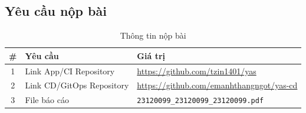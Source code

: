 \subsection{Yêu cầu nộp bài}

\begin{table}[H]
\centering
\caption{Thông tin nộp bài}
\begin{tabular}{|c|p{6cm}|p{7cm}|}
\hline
\textbf{\#} & \textbf{Yêu cầu} & \textbf{Giá trị} \\
\hline
1 & Link App/CI Repository & \url{https://github.com/tzin1401/yas} \\
\hline
2 & Link CD/GitOps Repository & \url{https://github.com/emanhthangngot/yas-cd} \\
\hline
3 & File báo cáo & \texttt{23120099\_23120099\_23120099.pdf} \\
\hline
\end{tabular}
\end{table}
